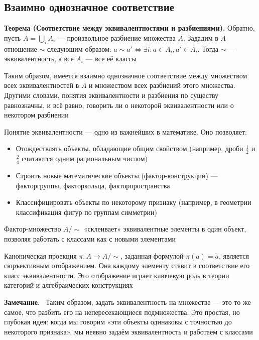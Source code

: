\documentclass[a4paper,12pt]{article}
\newcommand{\myremark}{\textbf{Замечание.}\ }
\theoremstyle{definition}
\theoremstyle{plain}
\theoremstyle{remark}
\begin{document}
	\subsection{Взаимно однозначное соответствие}
	
	\noindent \textbf{Теорема (Соответствие между эквивалентностями и разбиениями).}
	Обратно, пусть $A = \bigcup_i A_i$ — произвольное разбиение множества $A$. Зададим в $A$ отношение $\sim$ следующим образом: $a \sim a' \iff \exists i \colon a \in A_i, a' \in A_i$. Тогда $\sim$ — эквивалентность, а все $A_i$ — все её классы
	
	Таким образом, имеется взаимно однозначное соответствие между множеством всех эквивалентностей в $A$ и множеством всех разбиений этого множества. Другими словами, понятия эквивалентности и разбиения по существу равнозначны, и всё равно, говорить ли о некоторой эквивалентности или о некотором разбиении
	
	
	\begin{tcolorbox}[colback=purple!5, colframe=purple!50!black, title=Заметочка: Значение эквивалентности]
		Понятие эквивалентности — одно из важнейших в математике. Оно позволяет:
		\begin{itemize}
			\item Отождествлять объекты, обладающие общим свойством (например, дроби $\frac{1}{2}$ и $\frac{2}{4}$ считаются одним рациональным числом)
			\item Строить новые математические объекты (фактор-конструкции) — факторгруппы, факторкольца, факторпространства
			\item Классифицировать объекты по некоторому признаку (например, в геометрии классификация фигур по группам симметрии)
		\end{itemize}
		Фактор-множество $A/{\sim}$ «склеивает» эквивалентные элементы в один объект, позволяя работать с классами как с новыми элементами
	\end{tcolorbox}
	
	\begin{tcolorbox}[colback=yellow!5, colframe=orange!60!black, title=Важное замечание]
		Каноническая проекция $\pi \colon A \to A/{\sim}$, заданная формулой $\pi(a) = \widetilde{a}$, является сюръективным отображением. Она каждому элементу ставит в соответствие его класс эквивалентности. Это отображение играет ключевую роль в теории категорий и алгебраических конструкциях
	\end{tcolorbox}
	
	\myremark
	Таким образом, задать эквивалентность на множестве — это то же самое, что разбить его на непересекающиеся подмножества. Это простая, но глубокая идея: когда мы говорим «эти объекты одинаковы с точностью до некоторого признака», мы неявно задаём эквивалентность и работаем с классами
	
\end{document}
